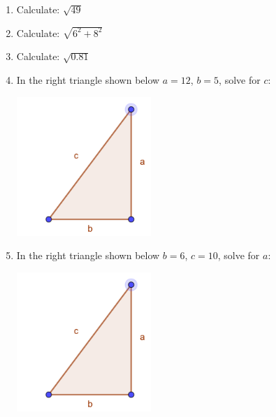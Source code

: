 \documentclass[12pt]{article}
\begin{document}
{}
\begin{enumerate}
\item Calculate: $\displaystyle \sqrt{49}$

\item Calculate: $\displaystyle \sqrt{6^2 + 8^2}$

\item Calculate: $ \sqrt{0.81}$

\item In the right triangle shown below $a=12$, $b=5$, solve for $c$:

\includegraphics[width=2in]{345triangle.png}

\item In the right triangle shown below $b=6$, $c=10$, solve for $a$:

\includegraphics[width=2in]{345triangle.png}


\end{enumerate}
\end{document}
